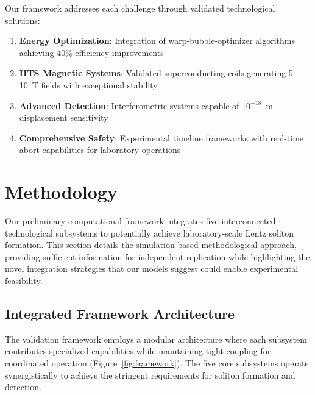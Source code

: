 \documentclass[12pt,a4paper]{article}
\begin{document}
Our framework addresses each challenge through validated technological solutions:
\begin{enumerate}
\item \textbf{Energy Optimization}: Integration of warp-bubble-optimizer algorithms achieving 40\% efficiency improvements
\item \textbf{HTS Magnetic Systems}: Validated superconducting coils generating 5--10~T fields with exceptional stability
\item \textbf{Advanced Detection}: Interferometric systems capable of $10^{-18}$~m displacement sensitivity
\item \textbf{Comprehensive Safety}: Experimental timeline frameworks with real-time abort capabilities for laboratory operations
\end{enumerate}

\section{Methodology}

Our preliminary computational framework integrates five interconnected technological subsystems to potentially achieve laboratory-scale Lentz soliton formation. This section details the simulation-based methodological approach, providing sufficient information for independent replication while highlighting the novel integration strategies that our models suggest could enable experimental feasibility.

\subsection{Integrated Framework Architecture}

The validation framework employs a modular architecture where each subsystem contributes specialized capabilities while maintaining tight coupling for coordinated operation (Figure~\ref{fig:framework}). The five core subsystems operate synergistically to achieve the stringent requirements for soliton formation and detection.
\end{document}
